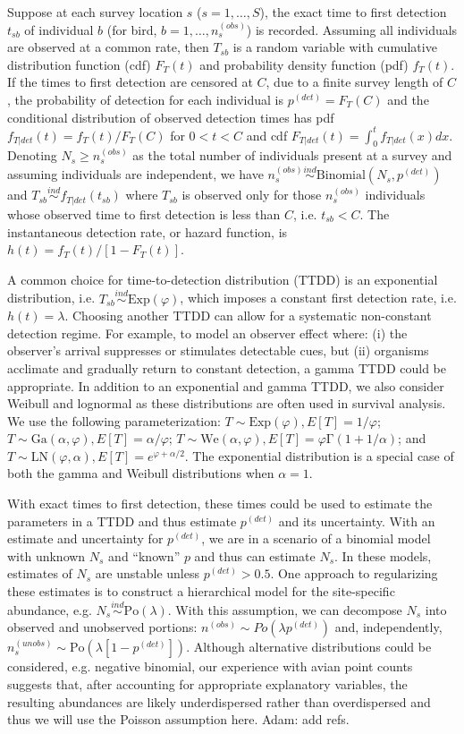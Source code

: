 \documentclass[useAMS,usenatbib,referee,12pt]{article}
\newcommand{\jarad}[1]{{\color{Orange} #1}}
\newcommand{\Exp}{\mbox{Exp}}
\newcommand{\Ga}{\mbox{Ga}}
\newcommand{\We}{\mbox{We}}
\newcommand{\LN}{\mbox{LN}}
\newcommand{\Po}{\mbox{Po}}
\newcommand{\pdet}{p^{(det)}}
\newcommand{\ind}{\stackrel{ind}{\sim}}
\begin{document}
Suppose at each survey location $s$ ($s=1,\dots,S$), the exact time to first detection $t_{sb}$ of individual $b$ (for bird, $b=1,\dots,n_s^{(obs)}$) is recorded.
Assuming all individuals are observed at a common rate, then $T_{sb}$ is a random variable with cumulative distribution function (cdf) $F_T(t)$ and probability density function (pdf) $f_T(t)$. 
If the times to first detection are censored at $C$, due to a finite survey length of $C$, the probability of detection for each individual is $\pdet=F_T(C)$ and the conditional distribution of observed detection times has pdf $f_{T|det}(t)= f_T(t)/F_T(C)$ for $0<t<C$ and cdf $F_{T|det}(t) = \int_0^t f_{T|det}(x) dx$. Denoting $N_{s}\ge n_s^{(obs)}$ as the total number of individuals present at a survey and assuming individuals are independent, we have $n_{s}^{(obs)} \ind \mbox{Binomial}\left(N_{s}, \pdet\right)$ and $T_{sb} \ind f_{T|det}(t_{sb})$
where $T_{sb}$ is observed only for those $n_s^{(obs)}$ individuals whose observed time to first detection is less than $C$, i.e. $t_{sb}<C$. 
The instantaneous detection rate, or hazard function, is $h(t) = f_T(t) / [1-F_T(t)]$.

A common choice for time-to-detection distribution (TTDD) is an exponential distribution, i.e. $T_{sb}\ind \mbox{Exp}(\varphi)$, which imposes a constant first detection rate, i.e. $h(t) = \lambda$.
Choosing another TTDD can allow for a systematic non-constant detection regime. 
For example, to model an observer effect where: (i) the observer's arrival suppresses or stimulates detectable cues, but (ii) organisms acclimate and gradually return to constant detection, a gamma TTDD could be appropriate.
In addition to an exponential and gamma TTDD, we also consider Weibull and lognormal as these distributions are often used in survival analysis. 
We use the following parameterization: $T\sim \Exp(\varphi), E[T]=1/\varphi$; $T\sim \Ga(\alpha,\varphi), E[T] = \alpha/\varphi$; $T\sim \We(\alpha,\varphi), E[T]=\varphi \mathrm{\Gamma}(1+1/\alpha)$; and $T\sim \LN(\varphi,\alpha), E[T] = e^{\varphi+\alpha/2}$.
The exponential distribution is a special case of both the gamma and Weibull distributions when $\alpha=1$. 

With exact times to first detection, these times could be used to estimate the parameters in a TTDD and thus estimate $\pdet$ and its uncertainty. 
With an estimate and uncertainty for $\pdet$, we are in a scenario of a binomial model with unknown $N_s$ and ``known'' $p$ and thus can estimate $N_s$.
In these models, estimates of $N_s$ are unstable unless $\pdet>0.5$.
One approach to regularizing these estimates is to construct a hierarchical model for the site-specific abundance, e.g. $N_s\ind \Po(\lambda)$. 
With this assumption, we can decompose $N_{s}$ into observed and unobserved portions: $n^{(obs)} \sim Po(\lambda \pdet)$ and, independently, $n_{s}^{(unobs)} \sim \Po\left(\lambda[1-\pdet]\right)$.
Although alternative distributions could be considered, e.g. negative binomial, our experience with avian point counts suggests that, after accounting for appropriate explanatory variables, the resulting abundances are likely underdispersed rather than overdispersed and thus we will use the Poisson assumption here. 
\jarad{Adam: add refs.}
\end{document}
